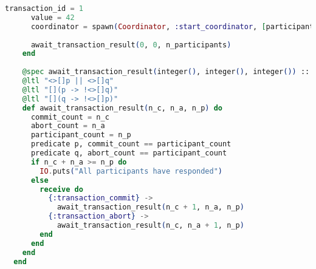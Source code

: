 \begin{lstlisting}[language=Elixir, xleftmargin=.1\linewidth]
      transaction_id = 1
      value = 42
      coordinator = spawn(Coordinator, :start_coordinator, [participants, transaction_id, value, n_participants])
  
      await_transaction_result(0, 0, n_participants)
    end
  
    @spec await_transaction_result(integer(), integer(), integer()) :: :ok
    @ltl "<>[]p || <>[]q"
    @ltl "[](p -> !<>[]q)"
    @ltl "[](q -> !<>[]p)"
    def await_transaction_result(n_c, n_a, n_p) do
      commit_count = n_c
      abort_count = n_a
      participant_count = n_p
      predicate p, commit_count == participant_count
      predicate q, abort_count == participant_count
      if n_c + n_a >= n_p do
        IO.puts("All participants have responded")
      else
        receive do
          {:transaction_commit} ->
            await_transaction_result(n_c + 1, n_a, n_p)
          {:transaction_abort} ->
            await_transaction_result(n_c, n_a + 1, n_p)
        end
      end
    end
  end
  
\end{lstlisting}


